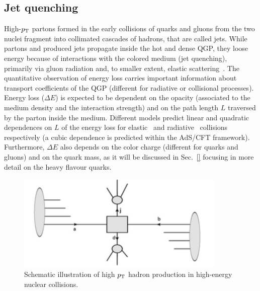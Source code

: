 \subsection{Jet quenching}
\label{sec:JetQuenching}
High-$p_{\rm T}$ partons formed in the early collisions of quarks and gluons from the two nuclei fragment into collimated cascades of hadrons, that are called jets. 
While partons and produced jets propagate inside the hot and dense QGP, they loose energy because of interactions with the colored medium (jet quenching), primarily via gluon radiation and, to smaller extent, elastic scattering~\cite{Qin:2015srf}. The quantitative observation of energy loss carries important information about transport coefficients of the QGP (different for radiative or collisional processes). Energy loss ($\Delta E$) is expected to be dependent on the opacity (associated to the medium density and the interaction strength) and on the path length $L$ traversed by the parton inside the medium. Different models predict linear and quadratic dependences on $L$ of the energy loss for elastic~\cite{Thoma:1990fm} and radiative~\cite{Baier:1996sk} collisions respectively (a cubic dependence is predicted within the AdS/CFT framework). Furthermore, $\Delta E$ also depends on the color charge (different for quarks and gluons) and on the quark mass, as it will be discussed in Sec.~\ref{} focusing in more detail on the heavy flavour quarks.

\begin{figure}[!ht]
  \centering
  \includegraphics[width=10cm]{FigCap1/Scattering.png}
  \caption{Schematic illustration of high $p_{\rm T}$ hadron production in high-energy nuclear collisions. }
  \label{fig:Scattering}
\end{figure}

